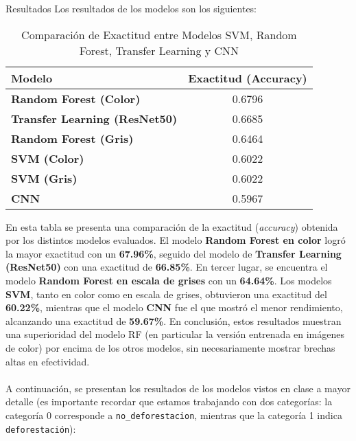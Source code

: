 \documentclass[11pt]{article}
\begin{document}
\begin{section}{Resultados}
Los resultados de los modelos son los siguientes:
\begin{table}[H]
\centering
\caption{Comparación de Exactitud entre Modelos SVM, Random Forest, Transfer Learning y CNN}
\begin{tabular}{|l|c|}
\hline
\textbf{Modelo}            & \textbf{Exactitud (Accuracy)} \\
\hline
\textbf{Random Forest (Color)} & 0.6796                         \\
\textbf{Transfer Learning (ResNet50)} & 0.6685                         \\
\textbf{Random Forest (Gris)} & 0.6464                         \\
\textbf{SVM (Color)}        & 0.6022                         \\
\textbf{SVM (Gris)}         & 0.6022                         \\
\textbf{CNN}                & 0.5967                         \\
\hline
\end{tabular}
\end{table}
En esta tabla se presenta una comparación de la exactitud (\textit{accuracy}) obtenida por los distintos modelos evaluados. El modelo \textbf{Random Forest en color} logró la mayor exactitud con un \textbf{67.96\%}, seguido del modelo de \textbf{Transfer Learning (ResNet50)} con una exactitud de \textbf{66.85\%}. En tercer lugar, se encuentra el modelo \textbf{Random Forest en escala de grises} con un \textbf{64.64\%}. Los modelos \textbf{SVM}, tanto en color como en escala de grises, obtuvieron una exactitud del \textbf{60.22\%}, mientras que el modelo \textbf{CNN} fue el que mostró el menor rendimiento, alcanzando una exactitud de \textbf{59.67\%}. En conclusión, estos resultados muestran una superioridad del modelo RF (en particular la versión entrenada en imágenes de color) por encima de los otros modelos, sin necesariamente mostrar brechas altas en efectividad.
\\
\\
A continuación, se presentan los resultados de los modelos vistos en clase a mayor detalle (es importante recordar que estamos trabajando con dos categorías: la categoría 0 corresponde a \texttt{no\_deforestacion}, mientras que la categoría 1 indica \texttt{deforestación}):
\\
\\
\begin{table}[H]
\centering

\end{table}
\end{section}
\end{document}
